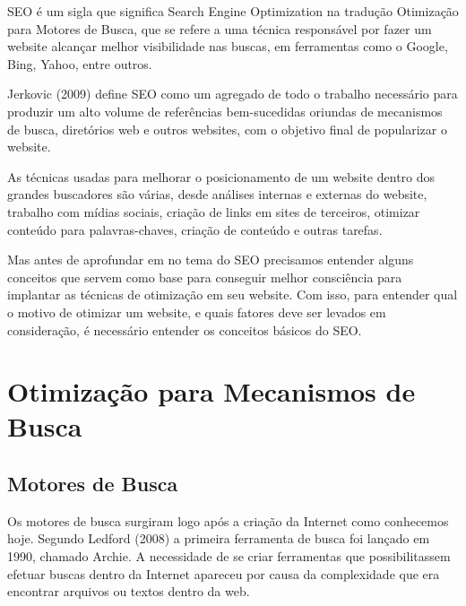 \documentclass[
	12pt,				%
	openright,			%
	twoside,			%
	a4paper,			%
	english,			%
	french,				%
	spanish,			%
	brazil				%
	]{abntex2}
\begin{document}
SEO é um sigla que significa Search Engine Optimization na tradução Otimização para Motores de Busca, que se refere a uma técnica responsável por fazer um website alcançar melhor visibilidade nas buscas, em ferramentas como o Google, Bing, Yahoo, entre outros. 

Jerkovic (2009) define SEO como um agregado de todo o trabalho necessário para produzir um alto volume de referências bem-sucedidas oriundas de mecanismos de busca, diretórios web e outros websites, com o objetivo final de popularizar o website.

As técnicas usadas para melhorar o posicionamento de um website dentro dos grandes buscadores são várias, desde análises internas e externas do website, trabalho com mídias sociais, criação de links em sites de terceiros, otimizar conteúdo para palavras-chaves, criação de conteúdo e outras tarefas.

Mas antes de aprofundar em no tema do SEO precisamos entender alguns conceitos que servem como base para conseguir melhor consciência para implantar as técnicas de otimização em seu website. Com isso, para entender qual o motivo de otimizar um website, e quais fatores deve ser levados em consideração, é necessário entender os conceitos básicos do SEO. 




\chapter{Otimização para Mecanismos de Busca}

\section{Motores de Busca}

Os motores de busca surgiram logo após a criação da Internet como conhecemos hoje. Segundo Ledford (2008) a primeira ferramenta de busca foi lançado em 1990, chamado Archie. A necessidade de se criar ferramentas que possibilitassem efetuar buscas dentro da Internet apareceu por causa da complexidade que era encontrar arquivos ou textos dentro da web.
\end{document}

